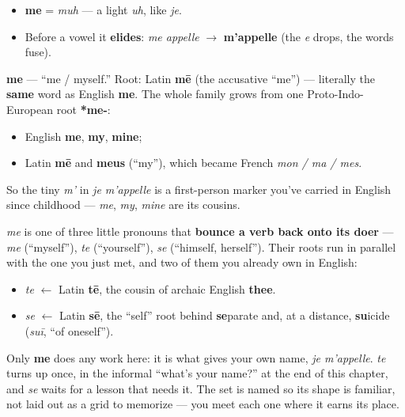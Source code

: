 \begin{sounds}
\begin{itemize}
\raggedright
  \item \textbf{me} = \emph{muh} — a light \emph{uh}, like \emph{je}.
  \item Before a vowel it \textbf{elides}: \emph{me appelle} $\to$ \textbf{m'appelle} (the \emph{e} drops, the words fuse).
\end{itemize}
\end{sounds}

\begin{cousinweb}
\textbf{me} — \textquotedblleft{}me / myself.\textquotedblright{} Root: Latin \textbf{mē} (the accusative \textquotedblleft{}me\textquotedblright{}) — literally the \textbf{same} word as English \textbf{me}. The whole family grows from one Proto-Indo-European root \textbf{*me-}:

\begin{itemize}
\raggedright
  \item English \textbf{me}, \textbf{my}, \textbf{mine};
  \item Latin \textbf{mē} and \textbf{meus} (\textquotedblleft{}my\textquotedblright{}), which became French \emph{mon / ma / mes}.
\end{itemize}

So the tiny \emph{m'} in \emph{je m'appelle} is a first-person marker you've carried in English since childhood — \emph{me}, \emph{my}, \emph{mine} are its cousins.
\end{cousinweb}

\begin{grammarlens}[title={Grammar Lens: the reflexive set (me / te / se)}]
\emph{me} is one of three little pronouns that \textbf{bounce a verb back onto its doer} — \emph{me} (\textquotedblleft{}myself\textquotedblright{}), \emph{te} (\textquotedblleft{}yourself\textquotedblright{}), \emph{se} (\textquotedblleft{}himself, herself\textquotedblright{}). Their roots run in parallel with the one you just met, and two of them you already own in English:

\begin{itemize}
\raggedright
  \item \emph{te} $\leftarrow$ Latin \textbf{tē}, the cousin of archaic English \textbf{thee}.
  \item \emph{se} $\leftarrow$ Latin \textbf{sē}, the \textquotedblleft{}self\textquotedblright{} root behind \textbf{se}parate and, at a distance, \textbf{su}icide (\emph{suī}, \textquotedblleft{}of oneself\textquotedblright{}).
\end{itemize}

Only \textbf{me} does any work here: it is what gives your own name, \emph{je m'appelle}. \emph{te} turns up once, in the informal \textquotedblleft{}what's your name?\textquotedblright{} at the end of this chapter, and \emph{se} waits for a lesson that needs it. The set is named so its shape is familiar, not laid out as a grid to memorize — you meet each one where it earns its place.
\end{grammarlens}

